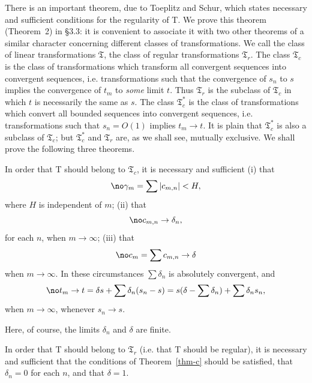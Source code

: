 There is an important theorem, due to Toeplitz and Schur, which states
necessary and sufficient conditions for the regularity of T. We prove this
theorem (Theorem~2) in \S3.3: it is convenient to associate it with two
other theorems of a similar character concerning different classes of
transformations. We call the class of linear transformations
$\mathfrak{T}$, the class of regular transformations $\mathfrak{T}_r$. The
class $\mathfrak{T}_c$ is the class of transformations which transform all
convergent sequences into convergent sequences, i.e. transformations such
that the convergence of $s_n$ to $s$ implies the convergence of $t_m$ to
\emph{some} limit $t$. Thus $\mathfrak{T}_r$ is the subclass of
$\mathfrak{T}_c$ in which $t$ is necessarily the same as $s$. The class
$\mathfrak{T}_c^*$ is the class of transformations which convert all
bounded sequences into convergent sequences, i.e. transformations such that
$s_n=O(1)$ implies $t_m\to t$. It is plain that $\mathfrak{T}_c^*$ is also
a subclass of $\mathfrak{T}_c$; but $\mathfrak{T}_c^*$ and $\mathfrak{T}_r$
are, as we shall see, mutually exclusive. We shall prove the following
three theorems.

\begin{theorem}\label{thm-c} In order that \textup{T} should belong to
$\mathfrak{T}_c$, it is necessary and sufficient \textup{(i)} that
$$\no \gamma_m = \sum|c_{m,n}| < H,$$
where $H$ is independent of $m$; \textup{(ii)} that
$$\no c_{m,n}\to\delta_n,$$
for each $n$, when $m\to\infty$; \textup{(iii)} that
$$\no c_m = \sum c_{m,n}\to\delta$$
when $m\to\infty$. In these circumstances $\sum\delta_n$ is absolutely
convergent, and
$$\no t_m\to t = \delta s+\sum\delta_n(s_n-s) = s(\delta-\sum\delta_n)+\sum\delta_ns_n,$$
when $m\to\infty$, whenever $s_n\to s$.
\end{theorem}

Here, of course, the limits $\delta_n$ and $\delta$ are finite.

\begin{theorem} In order that \textup{T} should belong to $\mathfrak{T}_r$
\textup{(}i.e. that \textup{T} should be regular\textup{)}, it is necessary
and sufficient that the conditions of Theorem~\ref{thm-c} should be
satisfied, that $\delta_n=0$ for each $n$, and that $\delta=1$.
\end{theorem}
